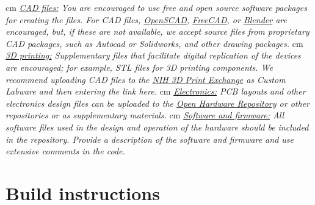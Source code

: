 \documentclass[11pt, letterpaper]{article}
\begin{document}
%
 cm
\noindent
\textit{\underline{CAD files:} You are encouraged to use free and open source software packages for creating the files. For CAD files, \href{http://www.openscad.org/}{OpenSCAD}, \href{http://www.freecadweb.org/}{FreeCAD}, or \href{https://www.blender.org/}{Blender} are encouraged, but, if these are not available, we accept source files from proprietary CAD packages, such as Autocad or Solidworks, and other drawing packages.}
 cm
\noindent
\textit{\underline{3D printing:} Supplementary files that facilitate digital replication of the devices are encouraged;  for example, STL files for 3D printing components. We recommend uploading CAD files to the \href{http://3dprint.nih.gov/}{\underline{NIH 3D Print Exchange}} as Custom Labware and then entering the link here.}
 cm
\noindent
\textit{\underline{Electronics:} PCB layouts and other electronics design files can be uploaded to the \href{http://www.ohwr.org/}{\underline{Open Hardware Repository}} or other repositories or as supplementary materials.}
 cm
\noindent
\textit{\underline{Software and firmware:} All software files used in the design and operation of the hardware should be included in the repository. Provide a description of the software and firmware and use extensive comments in the code.}

\newpage

\section*{Build instructions}

\end{document}
